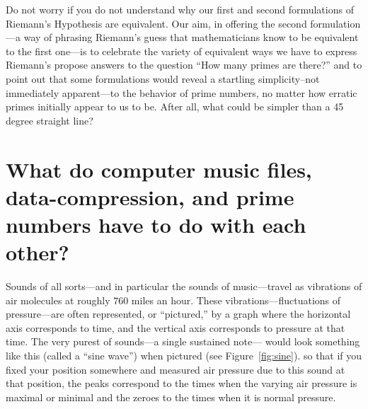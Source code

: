 \documentclass[11pt,draft]{article}
\theoremstyle{plain}
\theoremstyle{definition}
\numberwithin{equation}{section}
\numberwithin{figure}{section}
\numberwithin{table}{section}
\begin{document}
          \begin{center}
\end{center}

Do not worry if you do not understand why our first and second
formulations of Riemann's Hypothesis are equivalent. Our aim, in
offering the second formulation---a way of phrasing Riemann's guess
that mathematicians know to be equivalent to the first one---is to
celebrate the variety of equivalent ways we have to express Riemann's
propose answers to the question ``How many primes are there?'' and to
point out that some formulations would reveal a startling
simplicity--not immediately apparent---to the behavior of prime
numbers, no matter how erratic primes initially appear to us to
be. After all, what could be simpler than a 45 degree straight line?
 
 \bigskip


\section{What do  computer music files,  data-compression, and prime numbers have to do with each other?}

\bigskip


Sounds of all sorts---and in particular the sounds of music---travel
as vibrations of air molecules at roughly 760 miles an hour. These
vibrations---fluctuations of pressure---are often represented, or
``pictured,'' by a graph where the horizontal axis corresponds to
time, and the vertical axis corresponds to pressure at that time.  The
very purest of sounds---a single sustained note--- would look
something like this (called a ``sine wave'') when pictured (see
Figure~\ref{fig:sine}).  so that if you fixed your position somewhere
and measured air pressure due to this sound at that position, the
peaks correspond to the times when the varying air pressure is maximal
or minimal and the zeroes to the times when it is normal pressure.
\end{document}
